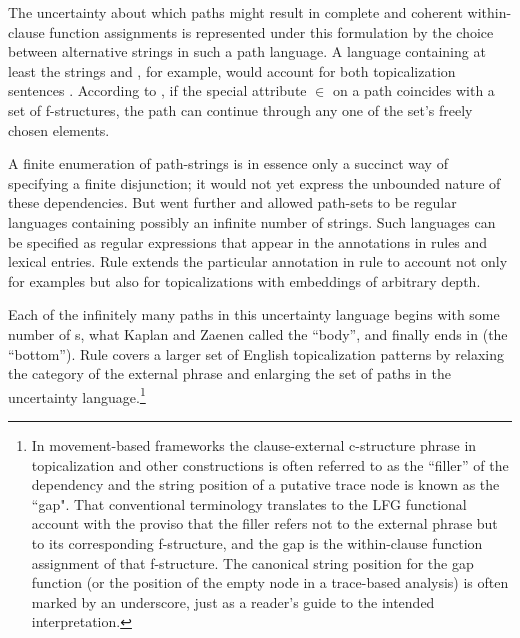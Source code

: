 \documentclass[output=paper,hidelinks]{langscibook}
\begin{document}
\noindent The uncertainty about which paths might result in complete and coherent within-clause function assignments is represented under this formulation by the choice between alternative strings in such a path language. A language containing at least the strings  and , for example, would account for both topicalization sentences . According to , if the special attribute $\in$ on a path coincides with a set of f-structures, the path can continue through any one of the set's freely chosen elements.
  
A finite enumeration of path-strings is in essence only a succinct way of specifying a finite disjunction; it would not yet express the unbounded nature of these dependencies.  But \citet{kaplzaen89} went further and allowed path-sets to be regular languages containing possibly an infinite number of strings. Such languages can be specified as regular expressions that appear in the annotations in rules and lexical entries.  Rule  extends the particular annotation in rule  to account not only for examples  but also for topicalizations with \COMP embeddings of arbitrary depth.

\ea \label{rule5componly}
\z

\noindent  Each of the infinitely many paths in this uncertainty language begins with some number of {\COMP}s, what Kaplan and Zaenen called the ``body'', and finally ends in \OBJ (the ``bottom'').  Rule  covers a larger set of English topicalization patterns by relaxing the category of the external phrase and enlarging the set of paths in the uncertainty language.\footnote{In movement-based frameworks the clause-external c-structure phrase in topicalization and other constructions is often referred to as the ``filler'' of the dependency and the string position of a putative trace node is known as the ``gap".  That conventional terminology translates to the LFG functional account with the proviso that the filler refers not to the external phrase but to its corresponding f-structure, and the gap is the within-clause function assignment of that f-structure. The canonical string position for the gap function (or the position of the empty node in a trace-based analysis) is often marked by an underscore, just as a reader's guide to the intended interpretation.} 
\end{document}
